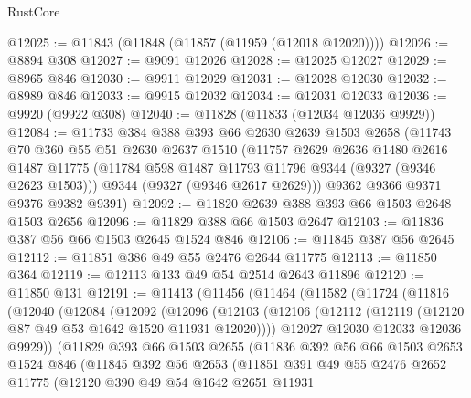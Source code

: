 \begin{lexlean}{RustCore}
\begin{coremodule}
@12025 := @11843 (@11848 (@11857 (@11959 (@12018 @12020))))
@12026 := @8894 @308
@12027 := @9091 @12026
@12028 := @12025 @12027
@12029 := @8965 @846
@12030 := @9911 @12029
@12031 := @12028 @12030
@12032 := @8989 @846
@12033 := @9915 @12032
@12034 := @12031 @12033
@12036 := @9920 (@9922 @308)
@12040 := @11828 (@11833 (@12034 @12036 @9929))
@12084 := @11733
    @384
    @388
    @393
    @66
    @2630
    @2639
    @1503
    @2658
    (@11743
      @70
      @360
      @55
      @51
      @2630
      @2637
      @1510
      (@11757
        @2629
        @2636
        @1480
        @2616
        @1487
        @11775
        (@11784 @598 @1487 @11793 @11796 @9344 (@9327 (@9346 @2623 @1503)))
        @9344
        (@9327 (@9346 @2617 @2629)))
      @9362
      @9366
      @9371
      @9376
      @9382
      @9391)
@12092 := @11820 @2639 @388 @393 @66 @1503 @2648 @1503 @2656
@12096 := @11829 @388 @66 @1503 @2647
@12103 := @11836 @387 @56 @66 @1503 @2645 @1524 @846
@12106 := @11845 @387 @56 @2645
@12112 := @11851 @386 @49 @55 @2476 @2644 @11775
@12113 := @11850 @364
@12119 := @12113 @133 @49 @54 @2514 @2643 @11896
@12120 := @11850 @131
@12191 := @11413
    (@11456
      (@11464
        (@11582
          (@11724
            (@11816
              (@12040
                (@12084
                  (@12092
                    (@12096
                      (@12103
                        (@12106 (@12112 (@12119 (@12120 @87 @49 @53 @1642 @1520 @11931 @12020))))
                        @12027
                        @12030
                        @12033
                        @12036
                        @9929))
                    (@11829
                      @393
                      @66
                      @1503
                      @2655
                      (@11836
                        @392
                        @56
                        @66
                        @1503
                        @2653
                        @1524
                        @846
                        (@11845
                          @392
                          @56
                          @2653
                          (@11851
                            @391
                            @49
                            @55
                            @2476
                            @2652
                            @11775
                            (@12120
                              @390
                              @49
                              @54
                              @1642
                              @2651
                              @11931

\end{coremodule}
\end{lexlean}
